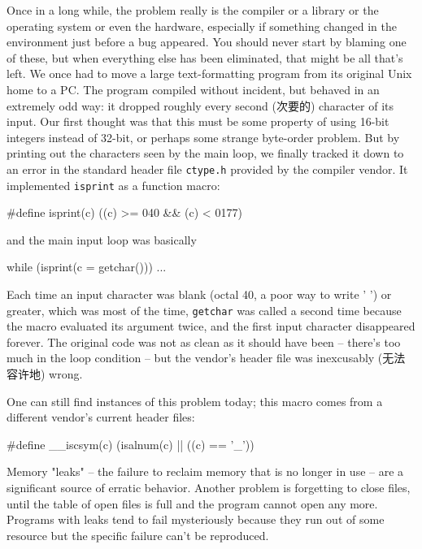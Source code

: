 Once in a long while, the problem really is the compiler or a library or
the operating system or even the hardware, especially if something changed
in the environment just before a bug appeared. You should never start by
blaming one of these, but when everything else has been eliminated, that
might be all that's left. We once had to move a large text-formatting
program from its original Unix home to a PC.  The program compiled without
incident, but behaved in an extremely odd way: it dropped roughly every
second (次要的) character of its input. Our first thought was that this
must be some property of using 16-bit integers instead of 32-bit, or
perhaps some strange byte-order problem. But by printing out the characters
seen by the main loop, we finally tracked it down to an error in the
standard header file \verb'ctype.h' provided by the compiler vendor. It
implemented \verb'isprint' as a function macro:
\begin{badcode}
    #define isprint(c) ((c) >= 040 && (c) < 0177)
\end{badcode}
and the main input loop was basically
\begin{badcode}
    while (isprint(c = getchar()))
        ...
\end{badcode}

Each time an input character was blank (octal 40, a poor way to write ' ')
or greater, which was most of the time, \verb'getchar' was called a second
time because the macro evaluated its argument twice, and the first input
character disappeared forever. The original code was not as clean as it
should have been -- there's too much in the loop condition -- but the
vendor's header file was inexcusably (无法容许地) wrong.

One can still find instances of this problem today; this macro comes from a
different vendor's current header files:
\begin{badcode}
    #define __iscsym(c) (isalnum(c) || ((c) == '_'))
\end{badcode}

Memory "leaks" -- the failure to reclaim memory that is no longer in use --
are a significant source of erratic behavior. Another problem is forgetting
to close files, until the table of open files is full and the program
cannot open any more.  Programs with leaks tend to fail mysteriously
because they run out of some resource but the specific failure can't be
reproduced.

